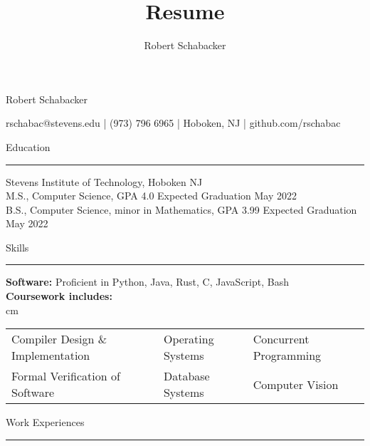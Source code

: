 \documentclass{article}
\title{Resume}
\author{Robert Schabacker}
\newcommand \spacingBetweenHeadings {0.3em}
\newcommand \spacingAfterHeadings {0.5em}
\begin{document}
\begin{center}
{\huge Robert Schabacker\par}
\vspace{0.3em}
{\Large rschabac@stevens.edu  |  (973) 796 6965  |  Hoboken, NJ  |  github.com/rschabac\par}
\end{center}
\vspace{-1.3em}
\vspace{\spacingBetweenHeadings}

\noindent
\huge Education\par
\vspace{0.1em}
\hrule
\Large
\vspace{\spacingAfterHeadings}
\noindent
Stevens Institute of Technology, Hoboken NJ\\
M.S., Computer Science, GPA 4.0
\hfill
Expected Graduation May 2022\\
B.S., Computer Science, minor in Mathematics, GPA 3.99
\hfill
Expected Graduation May 2022



\vspace{\spacingBetweenHeadings}

\noindent
\huge Skills\par
\vspace{0.1em}
\hrule
\Large
\vspace{\spacingAfterHeadings}
\noindent
\textbf{Software:} Proficient in Python, Java, Rust, C, JavaScript, Bash\\
\textbf{Coursework includes:}\\
 cm
\begin{tabular}{ l l l }
Compiler Design \& Implementation & Operating Systems   & Concurrent Programming\\ 
Formal Verification of Software   & Database Systems	& Computer Vision\\
\end{tabular}

\vspace{\spacingBetweenHeadings}

\noindent
\huge Work Experiences\par
\vspace{0.1em}
\hrule
\Large
\vspace{\spacingAfterHeadings}
\end{document}
